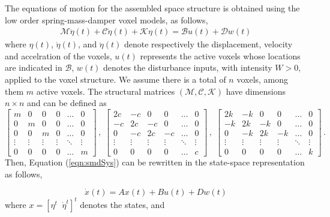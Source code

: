 \documentclass[11pt]{ucthesis}
\begin{document}
The equations of motion for the assembled space structure is obtained using the low order spring-mass-damper voxel models, as follows,
\begin{equation}
\begin{array}{l}
\mathcal{M} \ddot{\eta}(t) + \mathcal{C} \dot{\eta}(t) + \mathcal{K} \eta(t) = \mathcal{B} u(t) + \mathcal{D} w(t)
\end{array}
\label{eqn:smdSys}
\end{equation}
where $\eta (t)$, $\dot{\eta} (t)$, and $\ddot{\eta} (t)$ denote respectively the displacement, velocity and accelration of the voxels, $u (t)$ represents the active voxels whose locations are indicated in $\mathcal{B}$, $w (t)$ denotes the disturbance inputs, with intensity $W >0$, applied to the voxel structure. We assume there is a total of $n$ voxels, among them $m$ active voxels. The structural matrices $(\mathcal{M}, \mathcal{C}, \mathcal{K})$ have dimensions $n \times n$ and can be defined as
\begin{equation}
\begin{bmatrix}m&0&0&0&\dots&0\\0&m&0&0&\dots&0\\0&0&m&0&\dots&0\\\vdots&\vdots&\vdots&\vdots&\ddots&\vdots \\0&0&0&0&\dots&m\end{bmatrix} \,,\;
\begin{bmatrix}2c&-c&0&0&\dots&0\\-c&2c&- c&0&\dots&0\\0&-c&2c&-c&\dots&0\\ \vdots&\vdots&\vdots&\vdots&\ddots&\vdots \\0&0&0&0&\dots&c\end{bmatrix} \,,\;
\begin{bmatrix}2k&-k&0&0&\dots&0\\-k&2k&-k&0&\dots&0\\0&-k&2k&-k&\dots&0\\ \vdots&\vdots&\vdots&\vdots&\ddots&\vdots \\0&0&0&0&\dots&k\end{bmatrix} \,.
\label{eqn:EOS}
\end{equation}
Then, Equation (\ref{eqn:smdSys}) can be rewritten in the state-space representation as follows,

\begin{equation}
\dot{x} (t) = A x(t) + B u(t) + D w(t)
\label{sigma1}
\end{equation}
where $x = [\eta^t \;\; \dot{\eta}^t]^t$ denotes the states, and
\end{document}
